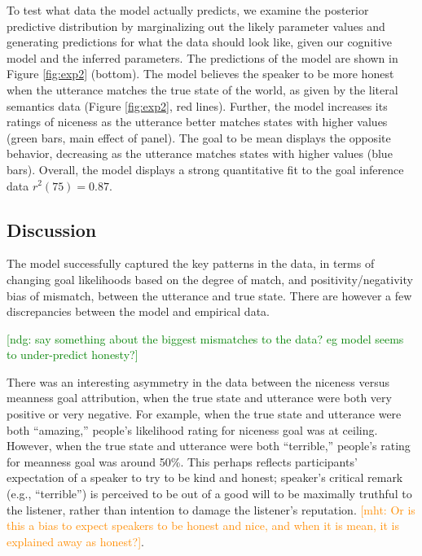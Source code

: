 \documentclass[10pt,letterpaper]{article}
\newcommand{\ndg}[1]{\textcolor{Green}{[ndg: #1]}}
\newcommand{\mht}[1]{\textcolor{DarkOrange}{[mht: #1]}}
\begin{document}


To test what data the model actually predicts, we examine the posterior predictive distribution by marginalizing out the likely parameter values and generating predictions for what the data should look like, given our cognitive model and the inferred parameters.
The predictions of the model are shown in Figure \ref{fig:exp2} (bottom).
The model believes the speaker to be more honest when the utterance matches the true state of the world, as given by the literal semantics data (Figure \ref{fig:exp2}, red lines). 
Further, the model increases its ratings of niceness as the utterance better matches states with higher values (green bars, main effect of panel).
The goal to be mean displays the opposite behavior, decreasing as the utterance matches states with higher values (blue bars).
Overall, the model displays a strong quantitative fit to the goal inference data $r^2(75) = 0.87$.


\subsection{Discussion}

The model successfully captured the key patterns in the data, 
in terms of changing goal likelihoods based on the degree of match, and positivity/negativity bias of mismatch, between the utterance and true state. 
There are however a few discrepancies between the model and empirical data. 

\ndg{say something about the biggest mismatches to the data? eg model seems to under-predict honesty?}

There was an interesting asymmetry in the data between the niceness versus meanness goal attribution, 
when the true state and utterance were both very positive or very negative. 
For example, when the true state and utterance were both ``amazing,'' people's likelihood rating for niceness goal was at ceiling. 
However, when the true state and utterance were both ``terrible,'' people's rating for meanness goal was around 50\%. 
This perhaps reflects participants' expectation of a speaker to try to be kind and honest; 
speaker's critical remark (e.g., ``terrible'') is perceived to be out of a good will to be maximally truthful to the listener, 
rather than intention to damage the listener's reputation. 
\mht{Or is this a bias to expect speakers to be honest and nice, and when it is mean, it is explained away as honest?}.
\end{document}
